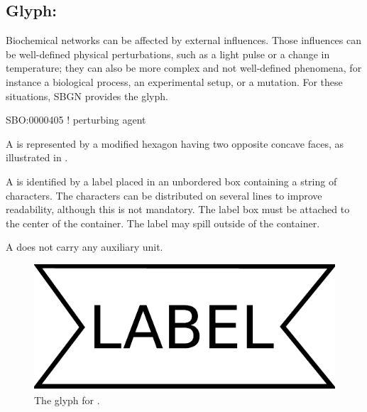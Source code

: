 \color{red}

\subsection{Glyph: }
\label{sec:perturbation}
 
Biochemical networks can be affected by external influences.  Those
influences can be well-defined physical perturbations, such as a light
pulse or a change in temperature; they can also be more complex and not
well-defined phenomena, for instance a biological process, an experimental
setup, or a mutation.  For these situations, SBGN provides the
 glyph.

\begin{glyphDescription}

\glyphSboTerm SBO:0000405 ! perturbing agent

\glyphContainer A  is represented by a modified hexagon
having two opposite concave faces, as illustrated in .

\glyphLabel A  is identified by a label placed in an
unbordered box containing a string of characters.  The characters can be
distributed on several lines to improve readability, although this is not
mandatory.  The label box must be attached to the center of the
 container.  The label may spill outside of the container.

\glyphAux A  does not carry any auxiliary unit.

\end{glyphDescription}

\begin{figure}[H]
  \centering
  \includegraphics[scale = 0.3]{images/perturbation}
  \caption{The \ER glyph for .}
  \label{fig:perturbation}
\end{figure}

\normalcolor
